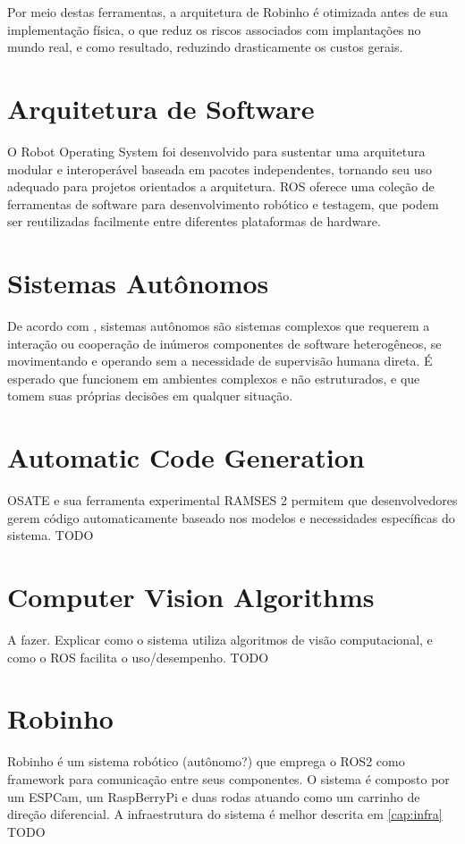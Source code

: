 Por meio destas ferramentas, a arquitetura de Robinho é otimizada antes de sua implementação física, o que reduz os riscos associados com implantações no mundo real, e como resultado, reduzindo drasticamente os custos gerais.

\section{Arquitetura de Software}
\cite{Bernardo2025, ROSWebsite} O Robot Operating System foi desenvolvido para sustentar uma arquitetura modular e interoperável baseada em pacotes independentes, tornando seu uso adequado para projetos orientados a arquitetura. ROS oferece uma coleção de ferramentas de software para desenvolvimento robótico e testagem, que podem ser reutilizadas facilmente entre diferentes plataformas de hardware.

\section{Sistemas Autônomos}
De acordo com \cite{Wahde2016, Bensalem2009}, sistemas autônomos são sistemas complexos que requerem a interação ou cooperação de inúmeros componentes de software heterogêneos, se movimentando e operando sem a necessidade de supervisão humana direta. É esperado que funcionem em ambientes complexos e não estruturados, e que tomem suas próprias decisões em qualquer situação.

\section{Automatic Code Generation}
OSATE e sua ferramenta experimental RAMSES 2 permitem que desenvolvedores gerem código automaticamente baseado nos modelos e necessidades específicas do sistema.
TODO

\section{Computer Vision Algorithms}
A fazer. Explicar como o sistema utiliza algoritmos de visão computacional, e como o ROS facilita o uso/desempenho.
TODO

\section{Robinho}
Robinho é um sistema robótico (autônomo?) que emprega o ROS2 como framework para comunicação entre seus componentes. O sistema é composto por um ESPCam, um RaspBerryPi e duas rodas atuando como um carrinho de direção diferencial.
A infraestrutura do sistema é melhor descrita em \ref{cap:infra}
TODO